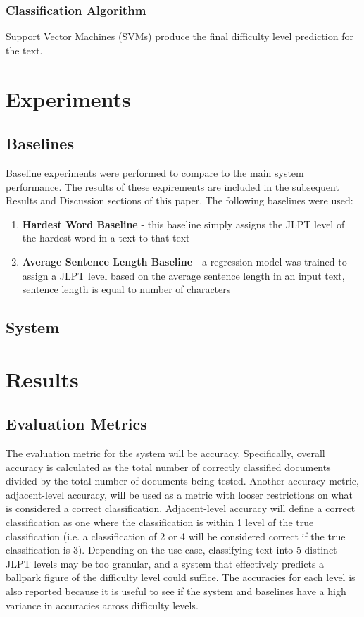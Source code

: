 \documentclass[12pt, a4paper]{article}
\begin{document}
\subsubsection{Classification Algorithm}

Support Vector Machines (SVMs) produce the final difficulty level prediction for the text. 


\section{Experiments}

\subsection{Baselines}

Baseline experiments were performed to compare to the main system performance. The results of these expirements
are included in the subsequent Results and Discussion sections of this paper. The following baselines were used:

\begin{enumerate}
    \item \textbf{Hardest Word Baseline} - this baseline simply assigns the JLPT level of the hardest word in a text to that text
    \item \textbf{Average Sentence Length Baseline} - a regression model was trained to assign a JLPT level based on the average sentence length in an input text, sentence length is equal to number of characters
\end{enumerate}

\subsection{System}


\section{Results}

\subsection{Evaluation Metrics}

The evaluation metric for the system will be accuracy. Specifically, overall accuracy is calculated as the total number of correctly classified documents divided by the 
total number of documents being tested. Another accuracy metric, adjacent-level accuracy, will be used as a metric with looser restrictions on what is 
considered a correct classification. Adjacent-level accuracy will define a correct classification as one where the classification is
within 1 level of the true classification (i.e. a classification of 2 or 4 will be considered correct if the true classification is 3). 
Depending on the use case, classifying text into 5 distinct JLPT levels may be too granular, and a system that effectively predicts
a ballpark figure of the difficulty level could suffice. The accuracies for each level is also reported because 
it is useful to see if the system and baselines have a high variance in accuracies across difficulty levels.
\end{document}
